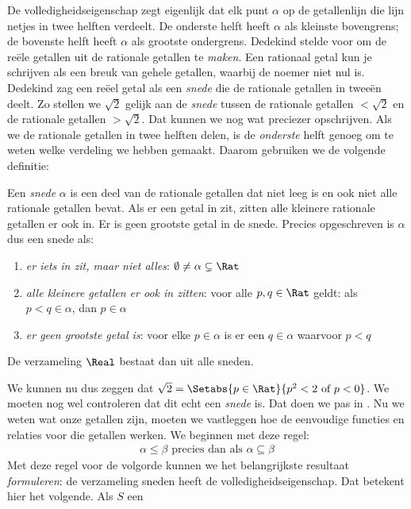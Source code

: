 \documentclass[openany]{memoir}
\begin{document}
De volledigheidseigenschap zegt eigenlijk dat elk punt $\alpha$ op de
getallenlijn die lijn netjes in twee helften verdeelt. De onderste
helft heeft $\alpha$ als kleinste bovengrens; de bovenste helft heeft
$\alpha$ als grootste ondergrens. Dedekind stelde voor om de reële
getallen uit de rationale getallen te \emph{maken}. Een rationaal getal
kun je schrijven als een breuk van gehele getallen, waarbij de noemer
niet nul is. Dedekind zag een
reëel getal als een \emph{snede} die de rationale getallen in tweeën
deelt. Zo stellen we $\sqrt{2}$ gelijk aan de \emph{snede} tussen de
rationale getallen $< \sqrt{2}$ en de rationale getallen $> \sqrt{2}$.
Dat kunnen we nog wat preciezer opschrijven. Als we de rationale getallen in twee
helften delen, is de \emph{onderste} helft genoeg om te weten welke
verdeling we hebben gemaakt. Daarom gebruiken we de volgende definitie:
\begin{defn}[Snede]
Een \emph{snede} $\alpha$ is een deel van de rationale getallen dat
niet leeg is en ook niet alle rationale getallen bevat. Als er een
getal in zit, zitten alle kleinere rationale getallen er ook in. Er is
geen grootste getal in de snede. Precies opgeschreven is $\alpha$ dus
een snede als:
\begin{enumerate}
	\item \emph{er iets in zit, maar niet alles}: $\emptyset \neq \alpha \subsetneq \Rat$
	\item \emph{alle kleinere getallen er ook in zitten}: voor alle $p,q \in \Rat$ geldt: als $p < q \in \alpha$, dan $p \in \alpha$
	\item \emph{er geen grootste getal is}: voor elke $p \in \alpha$ is er een $q \in \alpha$ waarvoor $p < q$
\end{enumerate}
De verzameling $\Real$ bestaat dan uit alle sneden.
\end{defn}
We kunnen nu dus zeggen dat $\sqrt{2} = \Setabs{p \in \Rat}{p^2 < 2\text{ of }p < 0}$. We moeten nog wel controleren dat dit echt een
\emph{snede} is. Dat doen we pas in .
Nu we weten wat onze getallen zijn, moeten we vastleggen hoe de
eenvoudige functies en relaties voor die getallen werken. We beginnen
met deze regel:
\begin{align*}
	\alpha \leq \beta \text{ precies dan als }\alpha \subseteq \beta
\end{align*}
Met deze regel voor de volgorde kunnen we het belangrijkste resultaat
\emph{formuleren}: de verzameling sneden heeft de
volledigheidseigenschap. Dat betekent hier het volgende. Als $S$ een
\end{document}
